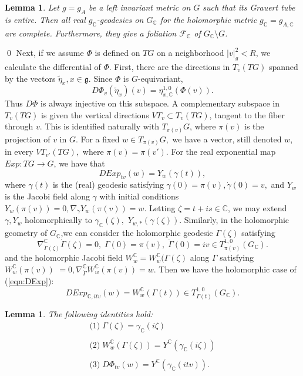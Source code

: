 \documentclass[12pt,reqno]{amsart}\usepackage{amssymb,amsmath,amscd,epsfig,amsthm,enumerate,import,eufrak}
\newtheorem{lemma}[theorem]{Lemma}
\theoremstyle{definition}
\theoremstyle{remark}
\numberwithin{equation}{section}
\theoremstyle{plain}
\theoremstyle{definition}
\def \c {\mathbb{C}}
\def \mfg {\mathfrak{g}}
\def \vs {\vskip 2mm}
\theoremstyle{remark}
\numberwithin{theorem}{section}
\begin{document}
%
\begin{lemma}  \label{lem:folGc}
Let $g = g_A$ be a left invariant metric on $G$ such that its Grauert tube is entire. Then all real $g_{\c}$-geodesics on $G_{\c}$ for the holomorphic metric $g_{\c} = g_{A, \c}$ are complete. Furthermore, they give a foliation $\mathcal{F}_{\c}$ of $G_{\c} \setminus G$.
\end{lemma}
\qed
%
% 
\vs
%
%
Next, if we assume $\Phi$ is defined on $TG$ on a neighborhood $|v|^2_g < R$, we calculate the differential of $\Phi$. First, there are the directions in $T_v(TG)$ spanned by the vectors $\tilde{\eta}_x, x \in \mfg$. Since $\Phi$ is $G$-equivariant, 
%
\vs
%
\[
	D\Phi_{v}(\tilde{\eta}_x)(v) = \eta^{1,0}_{x,\c}(\Phi(v)).
\]
%
%
\vs
%
%
Thus $D\Phi$ is always injective on this subspace. A complementary subspace in $T_v(TG)$ is given the vertical directions $VT_v \subset T_v(TG)$, tangent to the fiber through $v$. This is identified naturally with $T_{\pi(v)}G$, where $\pi(v)$ is the projection of $v$ in $G$. For a fixed $w \in T_{\pi(v)}G,$ we have a vector, still denoted $w$, in every $VT_{v'}(TG),$ where $\pi(v) =\pi(v').$ For the real exponential map $Exp: TG \to G$, we have that
%
%
\begin{equation}\label{eqn:DExp}
	DExp_{t v}(w) = Y_w(\gamma(t)),
\end{equation}
%
where $\gamma(t)$ is the (real) geodesic satisfying $\gamma(0) = \pi(v), \dot{\gamma}(0) = v,$ and $Y_w$ is the Jacobi field along $\gamma$ with initial conditions $Y_w(\pi(v)) = 0, \nabla_{\dot{\gamma}}Y_w(\pi(v)) = w.$ Letting $\zeta = t + i s \in \c$, we may extend $\gamma, Y_w$ holomorphically to $\gamma_{\c}(\zeta),$ $Y_{w, *}(\gamma(\zeta)).$ Similarly, in the holomorphic geometry of $G_{\c}$,we can consider the holomorphic geodesic $\Gamma(\zeta)$ satisfying 
%
\vs
%
\begin{equation}\label{eqn:Gamma}
	\nabla^{\c}_{\dot{\Gamma}(\zeta)} \dot{\Gamma}(\zeta) = 0, \; \Gamma(0) =\pi(v), \; \dot{\Gamma}(0) = i v \in T^{1,0}_{\pi(v)}(G_{\c}).
\end{equation}
%
%
\vs
%
and the holomorphic Jacobi field $W^{\c}_w = W^{\c}_w(\Gamma(\zeta)$ along $\Gamma$ satisfying $W_w^{\c}(\pi(v))$ $= 0, \nabla^{\c}_{\dot{\Gamma}} W_w^{\c}(\pi(v)) = w.$ Then we have the holomorphic case of (\ref{eqn:DExp}):
%
%
\vs\vs
%
\begin{equation}\label{eqn:DExpC}
	DExp_{\c, i t v }(w) = W^{\c}_w(\Gamma(t)) \in T^{1,0}_{\Gamma(t)}(G_{\c}).
\end{equation}
%
\vs\vs
%
\begin{lemma}\label{lem:ICs} The following identities hold:
\[
	\begin{array}{l} \text{(1)}\; \Gamma(\zeta) = \gamma_{\c}(i \zeta) \\
	\\
	\text{(2)} \; W^{\c}_w(\Gamma(\zeta)) = Y^{\c}(\gamma_{\c}(i \zeta))\\
	\\
	\text{(3)} \; D\Phi_{t v}(w) = Y^{\c}(\gamma_{\c}(i t v)).
	\end{array}
\]
\end{lemma}
\end{document}
